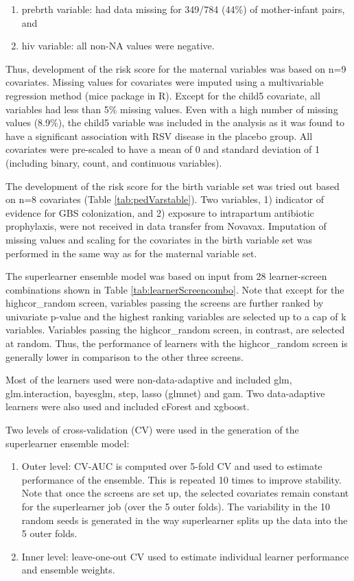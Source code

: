 \documentclass[11pt]{article}
\begin{document}
\begin{enumerate}
\def\labelenumi{\arabic{enumi}.}
\item
  prebrth variable: had data missing for 349/784 (44\%) of mother-infant pairs, and
\item
  hiv variable: all non-NA values were negative.
\end{enumerate}

Thus, development of the risk score for the maternal variables was based on n=9 covariates. Missing values for covariates were imputed using a multivariable regression method (mice package in R). Except for the child5 covariate, all variables had less than 5\% missing values. Even with a high number of missing values (8.9\%), the child5 variable was included in the analysis as it was found to have a significant association with RSV disease in the placebo group. All covariates were pre-scaled to have a mean of 0 and standard deviation of 1 (including binary, count, and continuous variables).

The development of the risk score for the birth variable set was tried out based on n=8 covariates (Table \ref{tab:pedVarstable}). Two variables, 1) indicator of evidence for GBS colonization, and 2) exposure to intrapartum antibiotic prophylaxis, were not received in data transfer from Novavax. Imputation of missing values and scaling for the covariates in the birth variable set was performed in the same way as for the maternal variable set.

The superlearner ensemble model was based on input from 28 learner-screen combinations shown in Table \ref{tab:learnerScreencombo}. Note that except for the highcor\_random screen, variables passing the screens are further ranked by univariate p-value and the highest ranking variables are selected up to a cap of k variables. Variables passing the highcor\_random screen, in contrast, are selected at random. Thus, the performance of learners with the highcor\_random screen is generally lower in comparison to the other three screens.

Most of the learners used were non-data-adaptive and included glm, glm.interaction, bayesglm, step, lasso (glmnet) and gam. Two data-adaptive learners were also used and included cForest and xgboost.

Two levels of cross-validation (CV) were used in the generation of the superlearner ensemble model:

\begin{enumerate}
\def\labelenumi{\arabic{enumi}.}
\item
  Outer level: CV-AUC is computed over 5-fold CV and used to estimate performance of the ensemble. This is repeated 10 times to improve stability. Note that once the screens are set up, the selected covariates remain constant for the superlearner job (over the 5 outer folds). The variability in the 10 random seeds is generated in the way superlearner splits up the data into the 5 outer folds.
\item
  Inner level: leave-one-out CV used to estimate individual learner performance and ensemble weights.
\end{enumerate}
\end{document}
